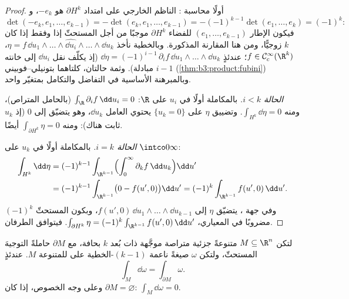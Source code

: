 \begin{proof}
أولًا محاسبة : الناظم الخارجي على امتداد $\partial H^k$
هو $-e_k$، و
\[
\det(-e_k, e_1, \dots, e_{k-1}) =
-\det(e_k, e_1, \dots, e_{k-1}) = -(-1)^{k-1}\det(e_1,
\dots, e_k) = (-1)^k :
\]
فيكون الإطار $(e_1, \dots, e_{k-1})$ للفضاء $\partial H^k$ موجبًا من أجل
 المستحثّ إذا وفقط إذا كان $k$ زوجيًّا، ومن هنا المقارنة
المذكورة. وبالخطية نأخذ $\eta
= f\,\dd u_1\wedge\dots\wedge\widehat{\dd
u_i}\wedge\dots\wedge\dd u_k$، $f \in \mathcal
C^\infty_c(\R^k)$؛ عندئذٍ $\dd\eta =
(-1)^{i-1}\,\partial_if\,\dd u_1\wedge\dots\wedge\dd u_k$ (إذ
يكلّف نقل $\dd u_i$ إلى خانته $i - 1$ مبادلة). وثمة حالتان،
كلتاهما بتونيلي--فوبيني (\cref{thm:b3:product:fubini}) وبالمبرهنة الأساسية في
التفاضل والتكامل بمتغيّر واحد.

\emph{الحالة $i < k$.} بالمكاملة أولًا في $u_i$ على $\R$:
$\int_\R\partial_if\,\dd u_i = 0$ (بالحامل المتراص)، ومنه $\int_{H^k}\dd\eta = 0$. وتضييق $\eta$ على
$\{u_k = 0\}$ يحتوي العامل $\dd u_k$، وهو يتضيّق إلى $0$ (إذ
$u_k$ ثابت هناك): ومنه $\int_{\partial H^k}\eta =
0$ أيضًا.

\emph{الحالة $i = k$.} بالمكاملة أولًا في $u_k$ على
$\intco0\infty$:
\begin{align*}
\int_{H^k}\dd\eta &= (-1)^{k-1}\int_{\R^{k-1}}
\Bigl(\int_0^\infty\partial_kf\,\dd u_k\Bigr)\dd u' \\
&= (-1)^{k-1}\int_{\R^{k-1}}\bigl(0 - f(u', 0)\bigr)\dd u'
= (-1)^k\int_{\R^{k-1}}f(u',0)\,\dd u' .
\end{align*}
وفي جهة ، يتضيّق $\eta$ إلى $f(u',
0)\,\dd u_1\wedge\dots\wedge\dd u_{k-1}$، وبكون 
المستحثّ $(-1)^k$ مضروبًا في المعياري، $\int_{\partial H^k}\eta =
(-1)^k\int_{\R^{k-1}}f(u',0)\,\dd u'$. فيتوافق
الطرفان.
\end{proof}

\begin{theorem}[ستوكس]\label{thm:b3:forms:stokes}
لتكن $M \subseteq \R^n$ متنوعةً جزئية متراصة موجَّهة ذات بُعد $k$ بحافة،
مع $\partial M$ حاملةً التوجيهَ المستحثّ، ولتكن $\omega$ صيغةً
ناعمة $(k-1)$-الخطية على  للمتنوعة $M$.
عندئذٍ
\[
\int_M\dd\omega = \int_{\partial M}\omega .
\]
وعلى وجه الخصوص، إذا كان $\partial M = \varnothing$: $\int_M\dd\omega = 0$.
\end{theorem}

